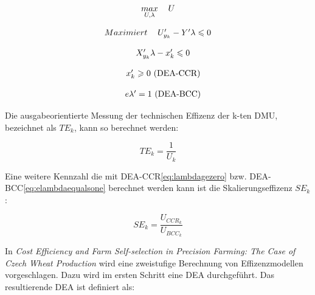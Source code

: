 \begin{equation}\label{eq:maxu}
	\begin{tabular}{rr}
		$\underset{U,\lambda}{max}$ & $U$	 	
	\end{tabular}
\end{equation}

\begin{equation}\label{eq:uy}
	\begin{tabular}{rr}
		$Maximiert$ & $U_{y_k}' - Y'\lambda \leqslant 0$	 	
	\end{tabular}
\end{equation}


\begin{equation}\label{eq:xylambda}
	\begin{tabular}{rr}
		$$ & $X_{y_k}'\lambda - x_k' \leqslant 0$	 	
	\end{tabular}
\end{equation}

\begin{equation}\label{eq:lambdagezero}
	\begin{tabular}{rr}
		$$ & $x_k' \geqslant 0$ (DEA-CCR)	 	
	\end{tabular}
\end{equation}

\begin{equation}\label{eq:elambdaequalsone}
	\begin{tabular}{rr}
		$$ & $e\lambda' = 1$ (DEA-BCC)	 	
	\end{tabular}
\end{equation}

Die ausgabeorientierte Messung der technischen Effizenz der k-ten DMU, bezeichnet als $TE_k$, kann so berechnet werden:

\begin{equation}
	TE_k= \frac{1}{U_k}
\end{equation}

Eine weitere Kennzahl die mit DEA-CCR\eqref{eq:lambdagezero} bzw. DEA-BCC\eqref{eq:elambdaequalsone} berechnet werden kann ist die Skalierungseffizenz $SE_k$:

\begin{equation}
	SE_k = \frac{U_{CCR_k}}{U_{BCC_k}}
\end{equation}

In \textit{Cost Efficiency and Farm Self-selection in Precision Farming: The Case of Czech Wheat Production}\cite{jour:Curtiss2012} wird eine zweistufige Berechnung von Effizenzmodellen vorgeschlagen. Dazu wird im ersten Schritt eine DEA durchgeführt. Das resultierende DEA ist definiert als:


